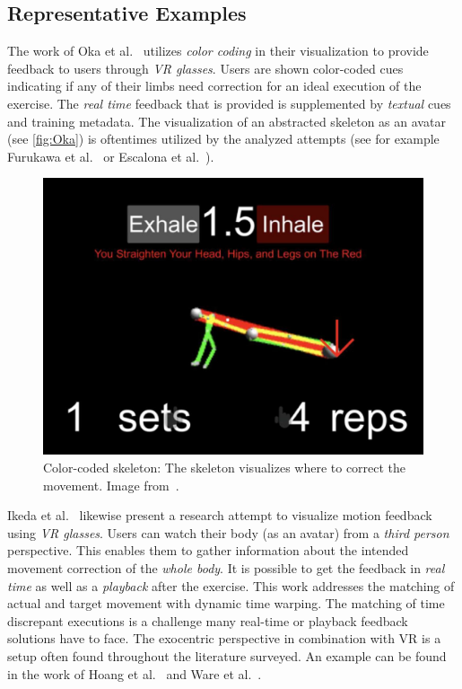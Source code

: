 \subsection{Representative Examples}
The work of Oka et al.~\cite{oka2021rtf} utilizes \emph{color coding} in their visualization to provide feedback to users through \emph{VR glasses}. Users are shown color-coded cues indicating if any of their limbs need correction for an ideal execution of the exercise. The \emph{real time} feedback that is provided is supplemented by \emph{textual} cues and training metadata. The visualization of an abstracted skeleton as an avatar (see \autoref{fig:Oka}) is oftentimes utilized by the analyzed attempts (see for example Furukawa et al.~\cite{furukawa2018dar} or Escalona et al.~\cite{escalona2020eva}).
\begin{figure}[ht]
    \includegraphics[width=\linewidth]{pictures/Oka.PNG}
    \caption{Color-coded skeleton: The skeleton visualizes where to correct the movement. Image from~\cite{oka2021rtf}.\label{fig:Oka}}
\end{figure}

Ikeda et al.~\cite{ikeda2018arb} likewise present a research attempt to visualize motion feedback using \emph{VR glasses}. Users can watch their body (as an avatar) from a \emph{third person} perspective. This enables them to gather information about the intended movement correction of the \emph{whole body}. It is possible to get the feedback in \emph{real time} as well as a \emph{playback} after the exercise. This work addresses the matching of actual and target movement with dynamic time warping. The matching of time discrepant executions is a challenge many real-time or playback feedback solutions have to face. The exocentric perspective in combination with VR is a setup often found throughout the literature surveyed. An example can be found in the work of Hoang et al.~\cite{hoang2016orp} and Ware et al.~\cite{ware2020wo2}.

